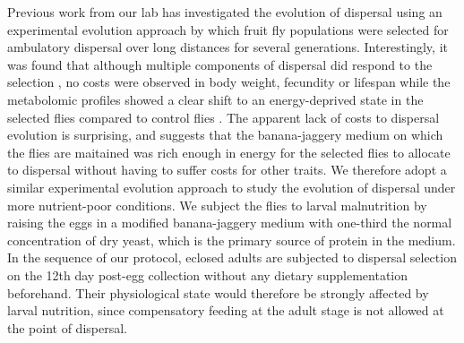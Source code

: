 \documentclass[12pt,onecolumn,twoside]{article}
\begin{document}
	Previous work from our lab has investigated the evolution of dispersal using an experimental evolution approach by which fruit fly populations were selected for ambulatory dispersal over long distances for several generations. Interestingly, it was found that although multiple components of dispersal did respond to the selection \citep{Tung2018}, no costs were observed in body weight, fecundity or lifespan while the metabolomic profiles showed a clear shift to an energy-deprived state in the selected flies compared to control flies \citep{Tung2018a}. The apparent lack of costs to dispersal evolution is surprising, and suggests that the banana-jaggery medium on which the flies are maitained was rich enough in energy for the selected flies to allocate to dispersal without having to suffer costs for other traits. We therefore adopt a similar experimental evolution approach to study the evolution of dispersal under more nutrient-poor conditions. We subject the flies to larval malnutrition by raising the eggs in a modified banana-jaggery medium with one-third the normal concentration of dry yeast, which is the primary source of protein in the medium. In the sequence of our protocol, eclosed adults are subjected to dispersal selection on the 12th day post-egg collection without any dietary supplementation beforehand. Their physiological state would therefore be strongly affected by larval nutrition, since compensatory feeding at the adult stage is not allowed at the point of dispersal.
\end{document}
